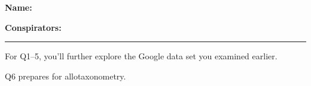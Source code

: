 \textbf{Name:} \\

\medskip

\textbf{Conspirators:} 

\medskip
\medskip

\hrule

\medskip



For Q1--5,
you'll further explore the Google data set
you examined earlier.

Q6 prepares for allotaxonometry.





